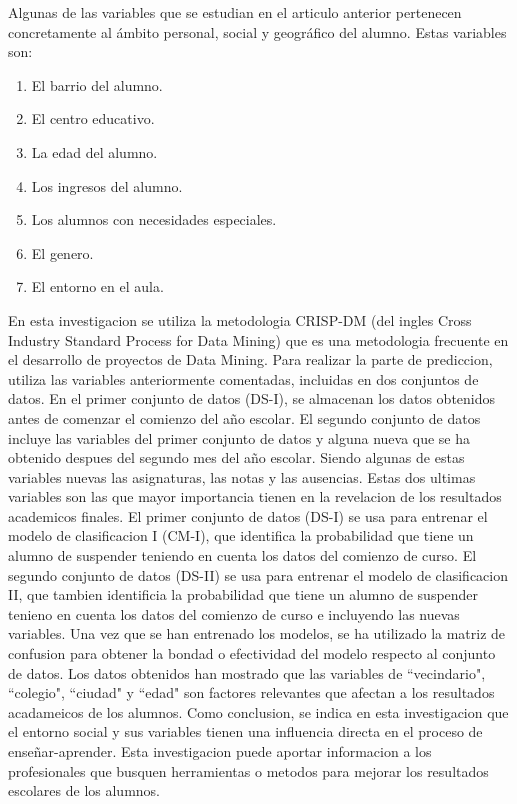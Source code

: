 \documentclass[spanish,12pt, a4paper,twoside]{paper}
\begin{document}
\justify
Algunas de las variables que se estudian en el articulo anterior pertenecen concretamente al ámbito personal, social y geográfico del alumno. Estas variables son:
\begin{enumerate}[itemsep=0mm]
\item El barrio del alumno.
\item El centro educativo.
\item La edad del alumno.
\item Los ingresos del alumno.
\item Los alumnos con necesidades especiales.
\item El genero. 
\item El entorno en el aula.
\end{enumerate}

\justify
En esta investigacion se utiliza la metodologia CRISP-DM (del ingles Cross Industry Standard Process for Data Mining) que es una metodologia frecuente en el desarrollo de proyectos de Data Mining.
\justify
Para realizar la parte de prediccion, utiliza las variables anteriormente comentadas, incluidas en dos conjuntos de datos. En el primer conjunto de datos (DS-I), se almacenan los datos obtenidos antes de comenzar el comienzo del año escolar. El segundo conjunto de datos incluye las variables del primer conjunto de datos y alguna nueva que se ha obtenido despues del segundo mes del año escolar. Siendo algunas de estas variables nuevas las asignaturas, las notas y las ausencias. Estas dos ultimas variables son las que mayor importancia tienen en la revelacion de los resultados academicos finales.
\justify
El primer conjunto de datos (DS-I) se usa para entrenar el modelo de clasificacion I (CM-I), que identifica la probabilidad que tiene un alumno de suspender teniendo en cuenta los datos del comienzo de curso. El segundo conjunto de datos (DS-II) se usa para entrenar el modelo de clasificacion II, que tambien identificia la probabilidad que tiene un alumno de suspender tenieno en cuenta los datos del comienzo de curso e incluyendo las nuevas variables. Una vez que se han entrenado los modelos, se ha utilizado la matriz de confusion para obtener la bondad o efectividad del modelo respecto al conjunto de datos. Los datos obtenidos han mostrado que las variables de ``vecindario", ``colegio", ``ciudad" y ``edad" son factores relevantes que afectan a los resultados acadameicos de los alumnos.
\justify
Como conclusion, se indica en esta investigacion que el entorno social y sus variables tienen una influencia directa en el proceso de enseñar-aprender. Esta investigacion puede aportar informacion a los profesionales que busquen herramientas o metodos para mejorar los resultados escolares de los alumnos.
\end{document}
